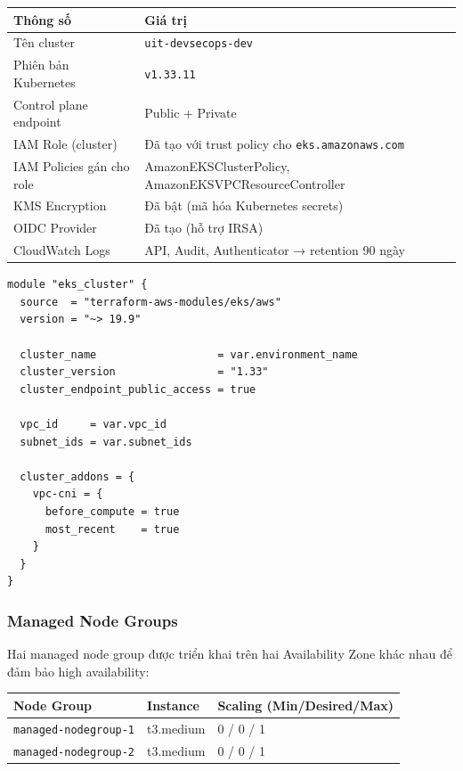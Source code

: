 \documentclass[12pt,a4paper]{article}
\begin{document}
\begin{table}[H]
\centering
\begin{tabular}{@{}ll@{}}
\toprule
\textbf{Thông số}              & \textbf{Giá trị} \\
\midrule
Tên cluster                     & \texttt{uit-devsecops-dev} \\
Phiên bản Kubernetes            & \texttt{v1.33.11} \\
Control plane endpoint          & Public + Private \\
IAM Role (cluster)              & Đã tạo với trust policy cho \texttt{eks.amazonaws.com} \\
IAM Policies gán cho role       & AmazonEKSClusterPolicy, AmazonEKSVPCResourceController \\
KMS Encryption                  & Đã bật (mã hóa Kubernetes secrets) \\
OIDC Provider                   & Đã tạo (hỗ trợ IRSA) \\
CloudWatch Logs                 & API, Audit, Authenticator → retention 90 ngày \\
\end{tabular}
\end{table}

\begin{lstlisting}[caption={Khai báo EKS cluster trong Terraform},label={lst:eks}]
module "eks_cluster" {
  source  = "terraform-aws-modules/eks/aws"
  version = "~> 19.9"

  cluster_name                   = var.environment_name
  cluster_version                = "1.33"
  cluster_endpoint_public_access = true

  vpc_id     = var.vpc_id
  subnet_ids = var.subnet_ids

  cluster_addons = {
    vpc-cni = {
      before_compute = true
      most_recent    = true
    }
  }
}
\end{lstlisting}

\subsubsection{Managed Node Groups}

Hai managed node group được triển khai trên hai Availability Zone khác nhau để đảm bảo high availability:

\begin{table}[H]
\centering
\begin{tabular}{@{}lll@{}}
\toprule
\textbf{Node Group}          & \textbf{Instance} & \textbf{Scaling (Min/Desired/Max)} \\
\midrule
\texttt{managed-nodegroup-1} & t3.medium         & 0 / 0 / 1 \\
\texttt{managed-nodegroup-2} & t3.medium         & 0 / 0 / 1 \\
\bottomrule
\end{tabular}
\end{table}
\end{document}

